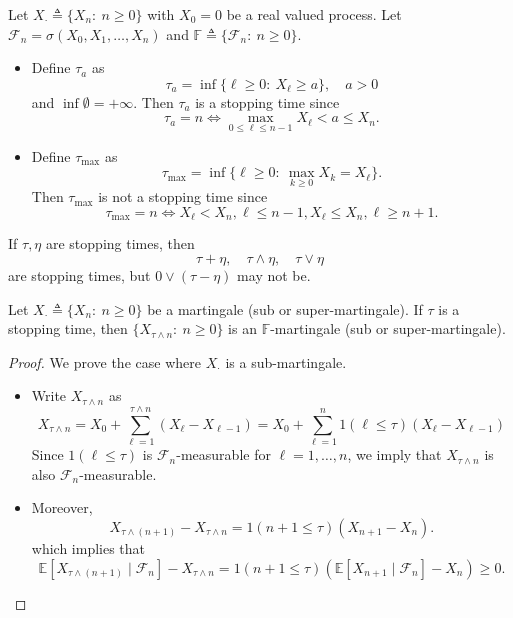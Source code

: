 \begin{example}
Let $X_{\cdot}\triangleq \{X_n:~n\ge0\}$ with $X_0=0$ be a real valued process.
Let $\mathcal{F}_n=\sigma(X_0,X_1,\ldots,X_n)$ and $\mathbb{F}\triangleq \{\mathcal{F}_n:~n\ge0\}$.
\begin{itemize}
\item
Define $\tau_a$ as 
\[
\tau_a = \inf\{\ell\ge0:~X_\ell\ge a\},\quad a>0
\]
and $\inf\emptyset=+\infty$.
Then $\tau_a$ is a stopping time since 
\[
\tau_a=n\Longleftrightarrow
\max_{0\le \ell\le n-1}X_\ell<a\le X_n.
\]
\item
Define $\tau_{\max}$ as 
\[
\tau_{\max}=\inf\{\ell\ge0:~\max_{k\ge0}X_k=X_\ell\}.
\]
Then $\tau_{\max}$ is not a stopping time since 
\[
\tau_{\max}=n
\Longleftrightarrow
X_\ell<X_n, \ell\le n-1,
X_\ell\le X_n, \ell\ge n+1.
\]
\end{itemize}
\end{example}
\begin{remark}
If $\tau,\eta$ are stopping times, then
\[
\tau+\eta,\quad \tau\land \eta,\quad \tau\lor\eta
\]
are stopping times, but $0\lor(\tau-\eta)$ may not be.
\end{remark}

\begin{proposition}\label{Pro:7:1}
Let $X_{\cdot}\triangleq \{X_n:~n\ge0\}$ be a martingale (sub or super-martingale).
If $\tau$ is a stopping time, then $\{X_{\tau\land n}:~n\ge0\}$ is an $\mathbb{F}$-martingale (sub or super-martingale).
\end{proposition}
\begin{proof}
We prove the case where $X_{\cdot}$ is a sub-martingale.
\begin{itemize}
\item
Write $X_{\tau\land n}$ as
\[
X_{\tau\land n}=X_0 + \sum_{\ell=1}^{\tau\land n}(X_{\ell} - X_{\ell-1})
=X_0 + \sum_{\ell=1}^{n}1(\ell\le \tau)(X_{\ell} - X_{\ell-1})
\]
Since $1(\ell\le \tau)$ is $\mathcal{F}_n$-measurable for $\ell=1,\ldots,n$, we imply that 
$X_{\tau\land n}$ is also $\mathcal{F}_n$-measurable.
\item
Moreover, 
\[
X_{\tau\land(n+1)}-X_{\tau\land n}=1(n+1\le \tau)(X_{n+1} - X_{n}).
\]
which implies that
\[
\mathbb{E}[X_{\tau\land(n+1)}\mid\mathcal{F}_n] - X_{\tau\land n}
=1(n+1\le \tau)(\mathbb{E}[X_{n+1}\mid\mathcal{F}_n] - X_{n})\ge0.
\]
\end{itemize}
\end{proof}

